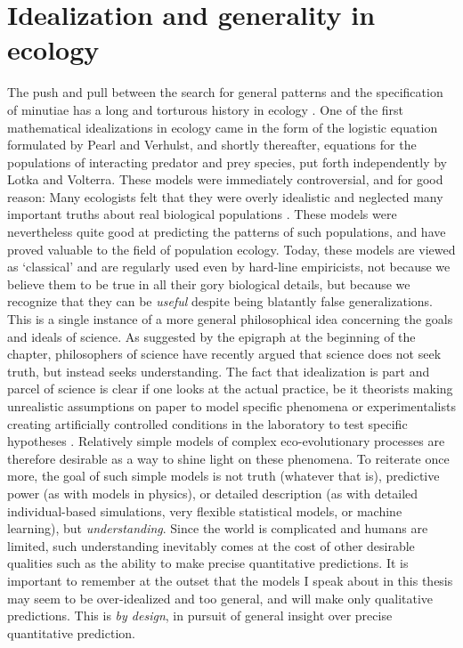\section{Idealization and generality in ecology}\label{idealization}
The push and pull between the search for general patterns and the specification of minutiae has a long and torturous history in ecology \citep{kingsland_modeling_1985}. One of the first mathematical idealizations in ecology came in the form of the logistic equation formulated by Pearl and Verhulst, and shortly thereafter, equations for the populations of interacting predator and prey species, put forth independently by Lotka and Volterra. These models were immediately controversial, and for good reason: Many ecologists felt that they were overly idealistic and neglected many important truths about real biological populations \citep{kingsland_modeling_1985}. These models were nevertheless quite good at predicting the patterns of such populations, and have proved valuable to the field of population ecology. Today, these models are viewed as `classical' and are regularly used even by hard-line empiricists, not because we believe them to be true in all their gory biological details, but because we recognize that they can be \emph{useful} despite being blatantly false generalizations. This is a single instance of a more general philosophical idea concerning the goals and ideals of science. As suggested by the epigraph at the beginning of the chapter, philosophers of science \citep{potochnik_idealization_2018} have recently argued that science does not seek truth, but instead seeks understanding. The fact that idealization is part and parcel of science is clear if one looks at the actual practice, be it theorists making unrealistic assumptions on paper to model specific phenomena or experimentalists creating artificially controlled conditions in the laboratory to test specific hypotheses \citep{zuk_models_2018}. Relatively simple models of complex eco-evolutionary processes are therefore desirable as a way to shine light on these phenomena. To reiterate once more, the goal of such simple models is not truth (whatever that is), predictive power (as with models in physics), or detailed description (as with detailed individual-based simulations, very flexible statistical models, or machine learning), but \emph{understanding}. Since the world is complicated and humans are limited, such understanding inevitably comes at the cost of other desirable qualities such as the ability to make precise quantitative predictions. It is important to remember at the outset that the models I speak about in this thesis may seem to be over-idealized and too general, and will make only qualitative predictions. This is \textit{by design}, in pursuit of general insight over precise quantitative prediction.\\
